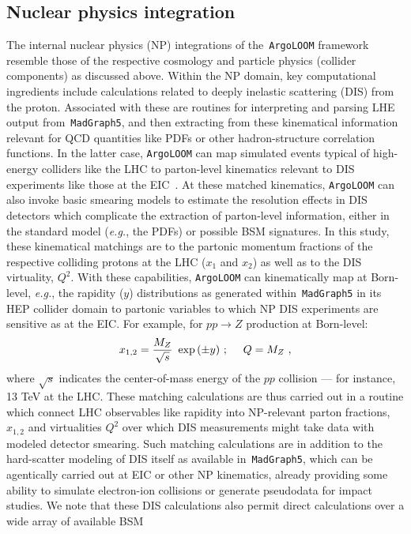 \documentclass[final,3p,times,sort,compress]{elsarticle}
\newcommand{\AL}{\texttt{ArgoLOOM}\xspace}
\newcommand{\MG}{\texttt{MadGraph5}\xspace}
\begin{document}
\subsection{Nuclear physics integration}
\label{sec:NP}
%
% 
The internal nuclear physics (NP) integrations of the~\AL framework resemble those of the
respective cosmology and particle physics (collider components) as discussed above.
%
Within the NP domain, key computational ingredients include calculations related to deeply inelastic scattering
(DIS) from the proton. Associated with these are routines for interpreting and
parsing LHE output from~\MG, and then extracting from these kinematical information relevant for QCD quantities
like PDFs or other hadron-structure correlation functions.
%
In the latter case, \AL can map simulated events typical of high-energy colliders like the LHC to parton-level kinematics
relevant to DIS experiments like those at the EIC~\cite{AbdulKhalek:2021gbh}.
%
At these matched kinematics, \AL can also invoke basic smearing models to estimate the resolution effects in DIS detectors
which complicate the extraction of parton-level information, either in the standard model ({\it e.g.}, the PDFs) or possible
BSM signatures.
%
In this study, these kinematical matchings are to the partonic momentum fractions of the respective colliding protons at the
LHC ($x_1$ and $x_2$) as well as to the DIS virtuality, $Q^2$.
%
With these capabilities, \AL can kinematically map at Born-level, {\it e.g.}, the rapidity ($y$)
distributions as generated within~\MG in its HEP collider domain to partonic variables to which NP DIS
experiments are sensitive as at the EIC. For example, for $pp \to Z$ production at Born-level:
%
\begin{equation}
    x_{1,2} = {M_Z \over \sqrt{s}}\ \exp\, (\pm y)\ ;\ \ \ \ Q = M_Z\ ,
\end{equation}
%
where $\sqrt{s}$ indicates the center-of-mass energy of the $pp$ collision --- for instance, 13 TeV
at the LHC.
%
These matching calculations are thus carried out in a routine
which connect LHC observables like rapidity into NP-relevant parton fractions, $x_{1,2}$ and virtualities
$Q^2$ over which DIS measurements might take data with modeled detector smearing.
%
Such matching calculations are in addition to the hard-scatter modeling of DIS itself as available in~\MG, which can
be agentically carried out at EIC or other NP kinematics, already providing some ability to simulate
electron-ion collisions or generate pseudodata for impact studies.
%
We note that these DIS calculations also permit direct calculations over a wide array of available BSM
\end{document}
